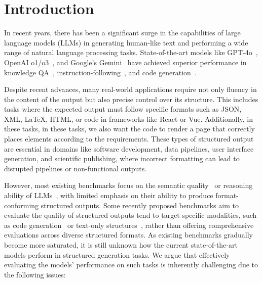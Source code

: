 \section{Introduction}
\label{sec:intro}

In recent years, there has been a significant surge in the capabilities of large language models (LLMs) in generating human-like text and performing a wide range of natural language processing tasks. State-of-the-art models like GPT-4o~\citep{Hurst2024GPT4oSC}, OpenAI o1/o3~\citep{Contributors2024OpenAIOS}, and Google's Gemini~\citep{team2023gemini} have achieved superior performance in knowledge QA~\citep{Hendrycks2020MeasuringMM,Wang2024MMLUProAM}, instruction-following~\citep{Chiang2024ChatbotAA,Zhou2023InstructionFollowingEF}, and code generation~\citep{Zhuo2024BigCodeBenchBC,Jain2024LiveCodeBenchHA}.

Despite recent advances, many real-world applications require not only fluency in the content of the output but also precise control over its structure. This includes tasks where the expected output must follow specific formats such as JSON, XML, LaTeX, HTML, or code in frameworks like React or Vue. Additionally, in these tasks, in these tasks, we also want the code to render a page that correctly places elements according to the requirements. These types of structured output are essential in domains like software development, data pipelines, user interface generation, and scientific publishing, where incorrect formatting can lead to disrupted pipelines or non-functional outputs.




However, most existing benchmarks focus on the semantic quality~\citep{Wang2024MMLUProAM} or reasoning ability of LLMs~\citep{Hendrycks2021MeasuringMP,He2024OlympiadBenchAC}, with limited emphasis on their ability to produce format-conforming structured outputs. Some recently proposed benchmarks aim to evaluate the quality of structured outputs tend to target specific modalities, such as code generation~\citep{Zhuo2024BigCodeBenchBC} or text-only structures~\citep{gu2024structext,tang-etal-2024-struc}, rather than offering comprehensive evaluations across diverse structured formats. As existing benchmarks gradually become more saturated, it is still unknown how the current state-of-the-art models perform in structured generation tasks. We argue that effectively evaluating the models' performance on such tasks is inherently challenging due to the following issues:



